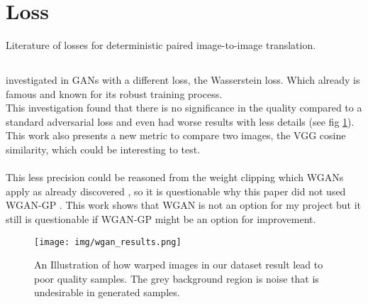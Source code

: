 		
	
	\newpage
	\section{Loss}
	\label{sec:lit-loss}
		Literature of losses for deterministic paired image-to-image translation.
		
		\subsection{}
			\citeauthor{noah_makow_wasserstein_2018} investigated in GANs with a different loss, the Wasserstein loss. Which already is famous and known for its robust training process.\\
			This investigation found that there is no significance in the quality compared to a standard adversarial loss and even had worse results with less details (see fig \ref{fig:wgan_vs_gan}).\\
			This work also presents a new metric to compare two images, the VGG cosine similarity, which could be interesting to test.\\
			\\
			This less precision could be reasoned from the weight clipping which WGANs apply as already discovered \cite{gulrajani_improved_2017}, so it is questionable why this paper did not used WGAN-GP \cite{gulrajani_improved_2017}. This work shows that WGAN is not an option for my project but it still is questionable if WGAN-GP might be an option for improvement.
			\begin{figure}[H]
				\centering
				\texttt{[image: img/wgan\_results.png]}
				\caption[Results of using WGAN]{An Illustration of how warped images in our dataset result lead to poor quality samples. The grey background region is noise that is undesirable in generated samples.}
				\label{fig:wgan_vs_gan}
			\end{figure}
			\FloatBarrier
			
